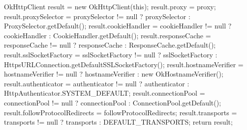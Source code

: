 \begin{prompt}
{{      OkHttpClient result = new OkHttpClient(this);
      result.proxy = proxy;
      result.proxySelector = proxySelector != null ? proxySelector : ProxySelector.getDefault();
      result.cookieHandler = cookieHandler != null ? cookieHandler : CookieHandler.getDefault();
      result.responseCache = responseCache != null ? responseCache : ResponseCache.getDefault();
      result.sslSocketFactory = sslSocketFactory != null
          ? sslSocketFactory
          : HttpsURLConnection.getDefaultSSLSocketFactory();
      result.hostnameVerifier = hostnameVerifier != null
          ? hostnameVerifier
          : new OkHostnameVerifier();
      result.authenticator = authenticator != null
          ? authenticator
          : HttpAuthenticator.SYSTEM_DEFAULT;
      result.connectionPool = connectionPool != null ? connectionPool : ConnectionPool.getDefault();
      result.followProtocolRedirects = followProtocolRedirects;
      result.transports = transports != null ? transports : DEFAULT_TRANSPORTS;
      return result;
    }
  }
\end{prompt}

